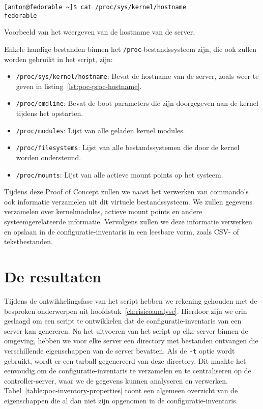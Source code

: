 \begin{listing}
  \begin{verbatim}
[anton@fedorable ~]$ cat /proc/sys/kernel/hostname
fedorable
  \end{verbatim}
  \caption{Voorbeeld van het weergeven van de hostname van de server.}
  \label{lst:poc-proc-hostname}
\end{listing}

Enkele handige bestanden binnen het \texttt{/proc}-bestandssysteem zijn, die ook zullen worden gebruikt in het script, zijn:

\begin{itemize}
    \item \texttt{/proc/sys/kernel/hostname}: Bevat de hostname van de server, zoals weer te geven in listing~\ref{lst:poc-proc-hostname}.
    \item \texttt{/proc/cmdline}: Bevat de boot parameters die zijn doorgegeven aan de kernel tijdens het opstarten.
    \item \texttt{/proc/modules}: Lijst van alle geladen kernel modules.
    \item \texttt{/proc/filesystems}: Lijst van alle bestandssystemen die door de kernel worden ondersteund.
    \item \texttt{/proc/mounts}: Lijst van alle actieve mount points op het systeem.
\end{itemize}

Tijdens deze Proof of Concept zullen we naast het verwerken van commando's ook informatie verzamelen uit dit virtuele bestandssysteem.
We zullen gegevens verzamelen over kernelmodules, actieve mount points en andere systeemgerelateerde informatie.
Vervolgens zullen we deze informatie verwerken en opslaan in de configuratie-inventaris in een leesbare vorm, zoals CSV- of tekstbestanden.

\section{De resultaten}
\label{poc_resultaten}

Tijdens de ontwikkelingsfase van het script hebben we rekening gehouden met de besproken onderwerpen uit hoofdstuk~\ref{ch:risicoanalyse}.
Hierdoor zijn we erin geslaagd om een script te ontwikkelen dat de configuratie-inventaris van een server kan genereren.
Na het uitvoeren van het script op elke server binnen de omgeving, hebben we voor elke server een directory met bestanden ontvangen die verschillende eigenschappen van de server bevatten.
Als de \texttt{-t} optie wordt gebruikt, wordt er een tarball gegenereerd van deze directory.
Dit maakte het eenvoudig om de configuratie-inventaris te verzamelen en te centraliseren op de controller-server, waar we de gegevens kunnen analyseren en verwerken.
Tabel~\ref{table:poc-inventory-properties} toont een algemeen overzicht van de eigenschappen die al dan niet zijn opgenomen in de configuratie-inventaris.

